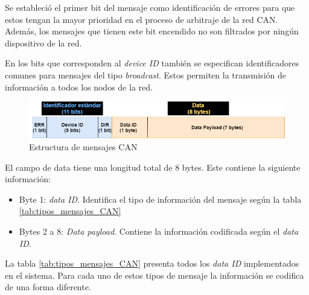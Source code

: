 Se estableció el primer bit del mensaje como identificación de errores para que  estos tengan la mayor prioridad en el proceso de arbitraje de la red CAN. Además, los mensajes que tienen este bit encendido no son filtrados por ningún dispositivo de la red.

En los bits que corresponden al \textit{device ID} también se especifican identificadores comunes para mensajes del tipo \textit{broadcast}. Estos permiten la transmisión de información a todos los nodos de la red.

\begin{figure}[htbp]
	\centering
	\includegraphics[scale=.5]{./Figures/estructura_mensaje.png}
	\caption{Estructura de mensajes CAN}
	\label{fig:estructura_mensajes}
\end{figure}

El campo de data tiene una longitud total de 8 bytes. Este contiene la siguiente información:
\begin{itemize}
	\item Byte 1: \textit{data ID}. Identifica el tipo de información del mensaje según la tabla \ref{tab:tipos_mensajes_CAN}
	\item Bytes 2 a 8: \textit{Data payload}. Contiene la información codificada según el \textit{data ID}.
\end{itemize}

La tabla \ref{tab:tipos_mensajes_CAN} presenta todos los \textit{data ID} implementados en el sistema. Para cada uno de estos tipos de mensaje la información se codifica de una forma diferente.

